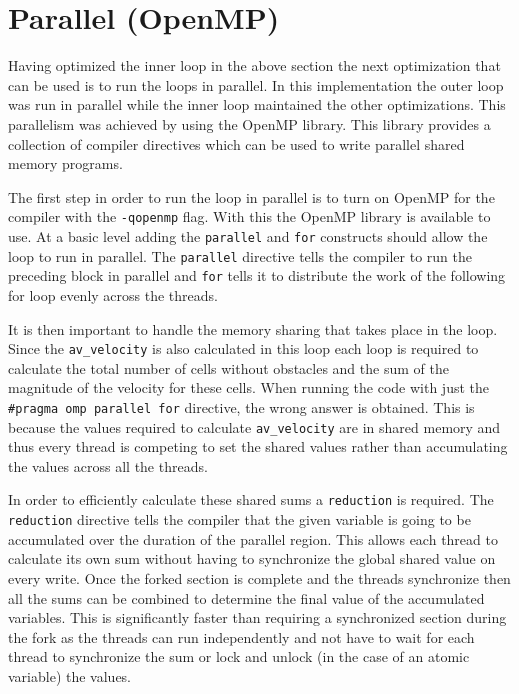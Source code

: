 \documentclass{article}
\begin{document}
\begin{multicols}{2}
\label{fig:rlparallel}

\section{Parallel (OpenMP)}

Having optimized the inner loop in the above section the next optimization that
can be used is to run the loops in parallel. In this implementation the outer
loop was run in parallel while the inner loop maintained the other
optimizations. This parallelism was achieved by using the OpenMP
library. This library provides a collection of compiler directives which can be
used to write parallel shared memory programs.

The first step in order to run the loop in parallel is to turn on OpenMP for the
compiler with the \verb|-qopenmp| flag. With this the OpenMP library is available to use.
At a basic level adding the \verb|parallel| and \verb|for| constructs should
allow the loop to run in parallel. The \verb|parallel| directive tells the
compiler to run the preceding block in parallel and \verb|for| tells it to
distribute the work of the following for loop evenly across the threads.

It is then important to handle the memory sharing that takes place in the loop.
Since the \verb|av_velocity| is also calculated in this loop each loop is
required to calculate the total number of cells without obstacles and the sum
of the magnitude of the velocity for these cells. When running the code with
just the \verb|#pragma omp parallel for| directive, the wrong answer is
obtained. This is because the values required to calculate \verb|av_velocity|
are in shared memory and thus every thread is competing to set the shared
values rather than accumulating the values across all the threads.

In order to efficiently calculate these shared sums a \verb|reduction| is
required. The \verb|reduction| directive tells the compiler that the given
variable is going to be accumulated over the duration of the parallel region. This allows
each thread to calculate its own sum without having to synchronize the global
shared value on every write. Once the forked section is complete and the
threads synchronize then all the sums can be combined to determine the final
value of the accumulated variables. This is significantly faster than requiring a
synchronized section during the fork as the threads can run independently and not have to wait
for each thread to synchronize the sum or lock and unlock (in the case of an
atomic variable) the values.


\end{multicols}
\end{document}
